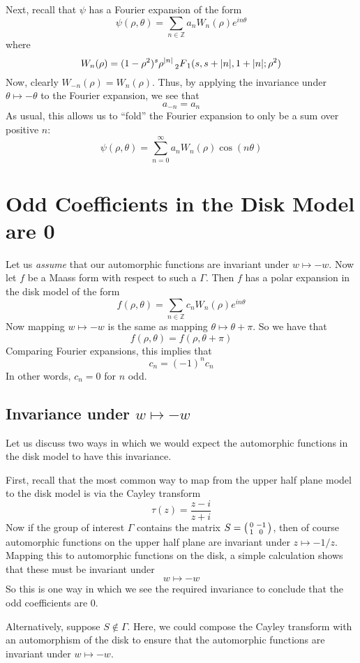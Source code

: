 \documentclass[]{article}
\begin{document}
Next, recall that $\psi$ has a Fourier expansion of the form
$$
\psi(\rho, \theta) = \sum_{n \in \mathbb{Z}}a_nW_n(\rho)e^{in\theta}
$$
where
$$
W_n(\rho) = (1 - \rho^2)^s\rho^{|n|} \prescript{}{2}{F}_1(s, s+|n|, 1+|n|; \rho^2)
$$
Now, clearly $W_{-n}(\rho) = W_n(\rho)$.
Thus, by applying the invariance under $\theta \mapsto -\theta$ to the Fourier expansion, we see that
$$
a_{-n} = a_n
$$
As usual, this allows us to ``fold'' the Fourier expansion to only be a sum over positive $n$:
$$
\psi(\rho, \theta) = \sum_{n = 0}^{\infty}a_nW_n(\rho)\cos(n\theta)
$$

\section*{Odd Coefficients in the Disk Model are 0}

Let us \textit{assume} that our automorphic functions are invariant under $w \mapsto -w$.
Now let $f$ be a Maass form with respect to such a $\Gamma$.
Then $f$ has a polar expansion in the disk model of the form
$$
f(\rho, \theta) = \sum_{n \in \mathbb{Z}}c_nW_n(\rho)e^{in\theta}
$$
Now mapping $w \mapsto -w$ is the same as mapping $\theta \mapsto \theta + \pi$.
So we have that
$$
f(\rho, \theta) = f(\rho, \theta + \pi)
$$
Comparing Fourier expansions, this implies that
$$
c_n = (-1)^nc_n
$$
In other words, $c_n = 0$ for $n$ odd.

\subsection*{Invariance under $w \mapsto -w$}

Let us discuss two ways in which we would expect the automorphic functions in the disk model to have this invariance.

First, recall that the most common way to map from the upper half plane model to the disk model is via the Cayley transform
$$
\tau(z) = \frac{z - i}{z + i}
$$
Now if the group of interest $\Gamma$ contains the matrix $S =
\begin{psmallmatrix}
0 & -1 \\
1 & 0
\end{psmallmatrix}$,
then of course automorphic functions on the upper half plane are invariant under $z \mapsto -1/z$.
Mapping this to automorphic functions on the disk, a simple calculation shows that these must be invariant under
$$
w \mapsto -w
$$
So this is one way in which we see the required invariance to conclude that the odd coefficients are $0$.

Alternatively, suppose $S \notin \Gamma$.
Here, we could compose the Cayley transform with an automorphism of the disk to ensure that the automorphic functions are invariant under $w \mapsto -w$.
\end{document}
